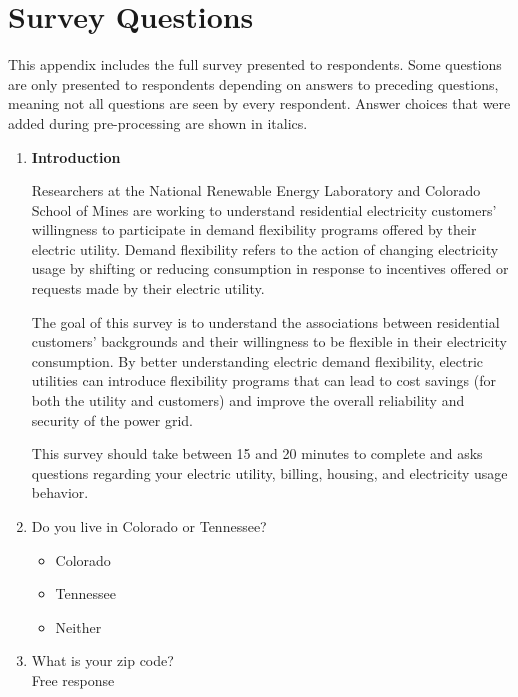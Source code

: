 \documentclass{article}
\begin{document}
\section*{Survey Questions}\label{survey}
This appendix includes the full survey presented to respondents. Some questions are only presented to respondents depending on answers to preceding questions, meaning not all questions are seen by every respondent. Answer choices that were added during pre-processing are shown in italics.

\newcommand{\checkbox}{$\square$\ }
 
 
\begin{enumerate}
 

\item \textbf{Introduction}

Researchers at the National Renewable Energy Laboratory and Colorado School of Mines are working to understand residential electricity customers' willingness to participate in demand flexibility programs offered by their electric utility. Demand flexibility refers to the action of changing electricity usage by shifting or reducing consumption in response to incentives offered or requests made by their electric utility.
 
The goal of this survey is to understand the associations between residential customers' backgrounds and their willingness to be flexible in their electricity consumption. By better understanding electric demand flexibility, electric utilities can introduce flexibility programs that can lead to cost savings (for both the utility and customers) and improve the overall reliability and security of the power grid.
 
This survey should take between 15 and 20 minutes to complete and asks questions regarding your electric utility, billing, housing, and electricity usage behavior.
 

\item Do you live in Colorado or Tennessee?
\begin{itemize}
  \item[\checkbox] Colorado
  \item[\checkbox] Tennessee
  \item[\checkbox] Neither
\end{itemize}
 

\item What is your zip code?\\
Free response
 


\end{enumerate}
\end{document}
